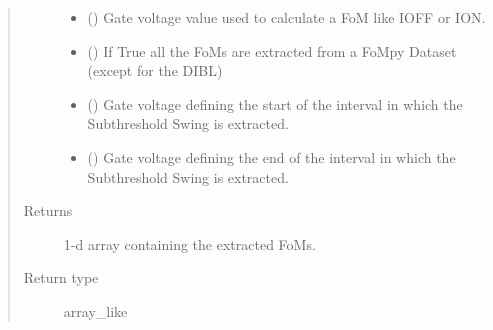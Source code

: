 \documentclass[letterpaper,10pt,english,openany, oneside]{sphinxmanual}
\begin{document}
\begin{fulllineitems}
\begin{quote}
\begin{description}
\begin{itemize}
\item {} 
 () \textendash{} Gate voltage value used to calculate a FoM like IOFF or ION.

\item {} 
 () \textendash{} If True all the FoMs are extracted from a FoMpy Dataset (except for the DIBL)

\item {} 
 () \textendash{} Gate voltage defining the start of the interval in which the Subthreshold Swing is extracted.

\item {} 
 () \textendash{} Gate voltage defining the end of the interval in which the Subthreshold Swing is extracted.

\end{itemize}

\item[{Returns}] \leavevmode
{} \textendash{} 1-d array containing the extracted FoMs.

\item[{Return type}] \leavevmode
array\_like

\end{description}\end{quote}

\end{fulllineitems}

\end{document}
